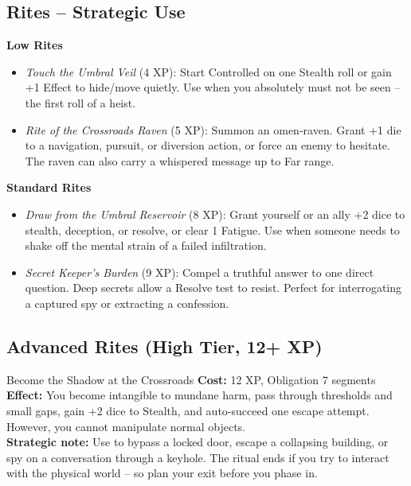 \documentclass[10pt,a5paper]{book}
\begin{document}
\subsection*{Rites – Strategic Use}

\textbf{Low Rites}
\begin{itemize}
    \item \textit{Touch the Umbral Veil} (4 XP): Start Controlled on one Stealth roll or gain +1 Effect to hide/move quietly. Use when you absolutely must not be seen – the first roll of a heist.
    \item \textit{Rite of the Crossroads Raven} (5 XP): Summon an omen‑raven. Grant +1 die to a navigation, pursuit, or diversion action, or force an enemy to hesitate. The raven can also carry a whispered message up to Far range.
\end{itemize}

\textbf{Standard Rites}
\begin{itemize}
    \item \textit{Draw from the Umbral Reservoir} (8 XP): Grant yourself or an ally +2 dice to stealth, deception, or resolve, or clear 1 Fatigue. Use when someone needs to shake off the mental strain of a failed infiltration.
    \item \textit{Secret Keeper’s Burden} (9 XP): Compel a truthful answer to one direct question. Deep secrets allow a Resolve test to resist. Perfect for interrogating a captured spy or extracting a confession.
\end{itemize}

\subsection*{Advanced Rites (High Tier, 12+ XP)}

\begin{patronbox}{Become the Shadow at the Crossroads}
\textbf{Cost:} 12 XP, Obligation 7 segments \\
\textbf{Effect:} You become intangible to mundane harm, pass through thresholds and small gaps, gain +2 dice to Stealth, and auto‑succeed one escape attempt. However, you cannot manipulate normal objects. \\
\textbf{Strategic note:} Use to bypass a locked door, escape a collapsing building, or spy on a conversation through a keyhole. The ritual ends if you try to interact with the physical world – so plan your exit before you phase in.
\end{patronbox}
\end{document}
